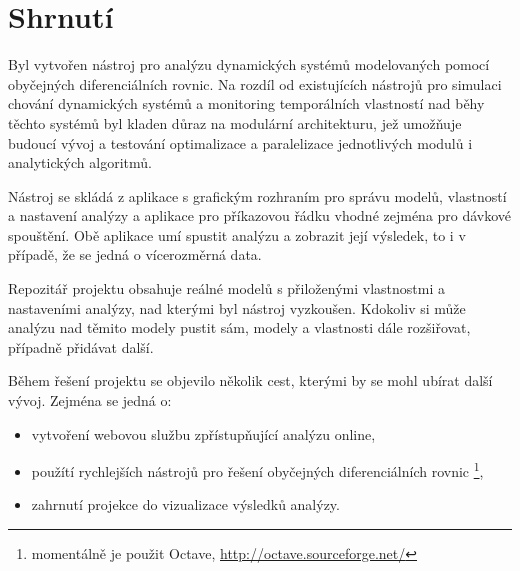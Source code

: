 \documentclass{parasim}
\begin{document}
\section{Shrnutí}

Byl vytvořen nástroj pro analýzu dynamických systémů modelovaných pomocí
obyčejných diferenciálních rovnic. Na rozdíl od existujících nástrojů pro simulaci chování
dynamických systémů a monitoring temporálních vlastností nad běhy těchto systémů byl kladen důraz
na modulární architekturu, jež umožňuje budoucí vývoj a testování
optimalizace a paralelizace jednotlivých modulů i analytických algoritmů.

Nástroj se skládá z aplikace s grafickým rozhraním pro správu modelů, vlastností a nastavení analýzy
a aplikace pro příkazovou řádku vhodné zejména pro dávkové spouštění. Obě aplikace umí spustit analýzu
a zobrazit její výsledek, to i v případě, že se jedná o vícerozměrná data.

Repozitář projektu obsahuje reálné modelů s přiloženými vlastnostmi a nastaveními analýzy,
nad kterými byl nástroj vyzkoušen. Kdokoliv si může analýzu nad těmito modely pustit sám, modely
a vlastnosti dále rozšiřovat, případně přidávat další.

Během řešení projektu se objevilo několik cest, kterými by se mohl ubírat další vývoj. Zejména se jedná o:

\begin{itemize}
	\item	vytvoření webovou službu zpřístupňující analýzu online,
	\item	použítí rychlejších nástrojů pro řešení obyčejných diferenciálních rovnic \footnote{momentálně je použit Octave, \url{http://octave.sourceforge.net/}},
	\item	zahrnutí projekce do vizualizace výsledků analýzy.
\end{itemize}
\end{document}
